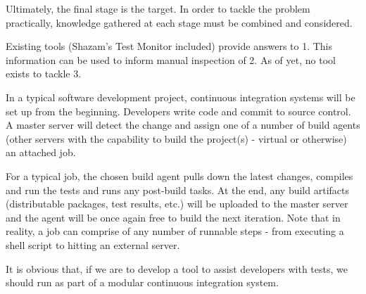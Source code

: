 Ultimately, the final stage is the target. In order to tackle the problem practically, knowledge gathered at each stage must be combined and considered.

Existing tools (Shazam’s \flaky{} Test Monitor included) provide answers to 1. This information can be used to inform manual inspection of 2. As of yet, no tool exists to tackle 3.

In a typical software development project, continuous integration systems will be set up from the beginning. Developers write code and commit to source control. A master server will detect the change and assign one of a number of build agents (other servers with the capability to build the project(s) - virtual or otherwise) an attached job.

For a typical job, the chosen build agent pulls down the latest changes, compiles and run the tests and runs any post-build tasks. At the end, any build artifacts (distributable packages, test results, etc.) will be uploaded to the master server and the agent will be once again free to build the next iteration. Note that in reality, a job can comprise of any number of runnable steps - from executing a shell script to hitting an external server.


It is obvious that, if we are to develop a tool to assist developers with \flaky{} tests, we should run as part of a modular continuous integration system.

